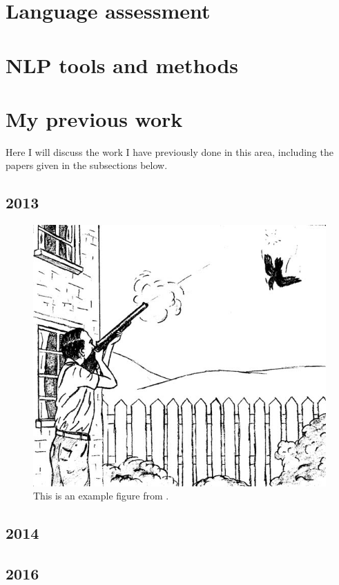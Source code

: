 \cite{tetreault:chodorow:08}

\section{Language assessment}
\label{section:languageAssessment}

\section{NLP tools and methods}
\label{section:NLP}

\section{My previous work}
\label{section:myPreviousWork}
Here I will discuss the work I have previously done in this area, including the papers given in the subsections below.

\subsection{2013}
\cite{king:dickinson:13}

\begin{figure}
\includegraphics[width=.7\textwidth]{figures/exampleprompt2.jpg}
\caption{This is an example figure from \citet{king:dickinson:13}.}
\label{figure:KandD2013}
\end{figure}

\subsection{2014}
\citet{king:dickinson:14}

\subsection{2016}
\citep{king:dickinson:16}

